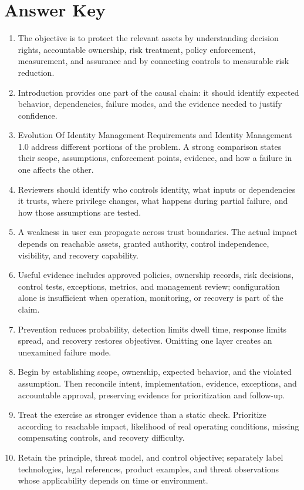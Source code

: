 \documentclass[11pt]{article}
\begin{document}
\section*{Answer Key}
\begin{enumerate}
\item The objective is to protect the relevant assets by understanding decision rights, accountable ownership, risk treatment, policy enforcement, measurement, and assurance and by connecting controls to measurable risk reduction.
\item Introduction provides one part of the causal chain: it should identify expected behavior, dependencies, failure modes, and the evidence needed to justify confidence.
\item Evolution Of Identity Management Requirements and Identity Management 1.0 address different portions of the problem. A strong comparison states their scope, assumptions, enforcement points, evidence, and how a failure in one affects the other.
\item Reviewers should identify who controls identity, what inputs or dependencies it trusts, where privilege changes, what happens during partial failure, and how those assumptions are tested.
\item A weakness in user can propagate across trust boundaries. The actual impact depends on reachable assets, granted authority, control independence, visibility, and recovery capability.
\item Useful evidence includes approved policies, ownership records, risk decisions, control tests, exceptions, metrics, and management review; configuration alone is insufficient when operation, monitoring, or recovery is part of the claim.
\item Prevention reduces probability, detection limits dwell time, response limits spread, and recovery restores objectives. Omitting one layer creates an unexamined failure mode.
\item Begin by establishing scope, ownership, expected behavior, and the violated assumption. Then reconcile intent, implementation, evidence, exceptions, and accountable approval, preserving evidence for prioritization and follow-up.
\item Treat the exercise as stronger evidence than a static check. Prioritize according to reachable impact, likelihood of real operating conditions, missing compensating controls, and recovery difficulty.
\item Retain the principle, threat model, and control objective; separately label technologies, legal references, product examples, and threat observations whose applicability depends on time or environment.
\end{enumerate}
\end{document}
